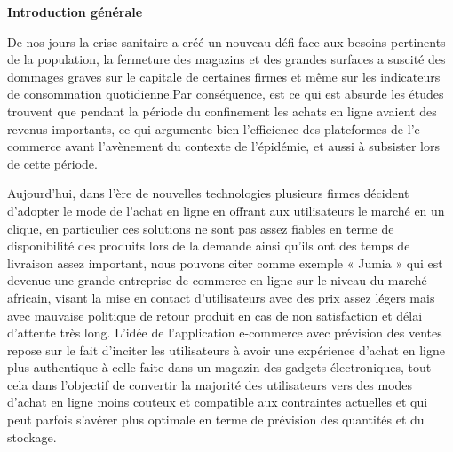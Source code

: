 \documentclass[a4paper]{report}
\begin{document}
\newpage
{}
\begin{doublespace}
\begin{center}
\vspace*{1cm}

\textbf{\huge{Introduction générale}}

\end{center}
\end{doublespace}
\begin{doublespace}
\renewcommand{\headrulewidth}{1pt}
\fancyhead[L]{\hspace*{5cm}}
De nos jours la crise sanitaire a créé un nouveau défi face aux besoins pertinents de la population, la fermeture des magazins et des grandes surfaces a suscité des dommages graves sur le capitale de certaines firmes et même sur les indicateurs de consommation quotidienne.Par conséquence, est ce qui est absurde les études trouvent que pendant la période du confinement les achats en ligne avaient des revenus importants, ce qui argumente bien l'efficience des plateformes de l'e-commerce avant l'avènement du contexte de l'épidémie, et aussi à subsister lors de cette période. 

Aujourd’hui, dans l’ère de nouvelles technologies plusieurs firmes décident d'adopter le mode de l'achat en ligne en offrant aux utilisateurs le marché en un clique, en particulier ces solutions ne sont pas assez fiables en terme de disponibilité  des produits lors de la demande ainsi qu'ils ont des temps de livraison assez important, nous pouvons citer comme exemple « Jumia » qui est devenue une grande entreprise de commerce en ligne sur le niveau du marché africain, visant la mise en contact d'utilisateurs avec des prix assez légers mais avec mauvaise  politique de retour produit en cas de non satisfaction et délai d'attente très long. 
L'idée de l'application e-commerce avec prévision des ventes  repose sur le fait d’inciter les utilisateurs à avoir une expérience d'achat en ligne plus authentique à celle faite dans un magazin des gadgets électroniques, tout cela dans l’objectif de convertir la majorité des utilisateurs vers des modes d'achat en ligne  moins couteux et compatible aux contraintes actuelles et qui peut parfois s’avérer plus optimale en terme de prévision des quantités et du stockage.
 

\end{doublespace}
\end{document}
